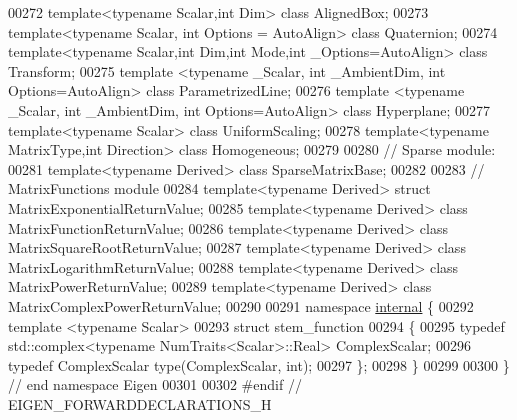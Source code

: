 \begin{DoxyCode}
00272 \textcolor{keyword}{template}<\textcolor{keyword}{typename} Scalar,\textcolor{keywordtype}{int} Dim> \textcolor{keyword}{class }AlignedBox;
00273 \textcolor{keyword}{template}<\textcolor{keyword}{typename} Scalar, \textcolor{keywordtype}{int} Options = AutoAlign> \textcolor{keyword}{class }Quaternion;
00274 \textcolor{keyword}{template}<\textcolor{keyword}{typename} Scalar,\textcolor{keywordtype}{int} Dim,\textcolor{keywordtype}{int} Mode,\textcolor{keywordtype}{int} \_Options=AutoAlign> \textcolor{keyword}{class }Transform;
00275 \textcolor{keyword}{template} <\textcolor{keyword}{typename} \_Scalar, \textcolor{keywordtype}{int} \_AmbientDim, \textcolor{keywordtype}{int} Options=AutoAlign> \textcolor{keyword}{class }ParametrizedLine;
00276 \textcolor{keyword}{template} <\textcolor{keyword}{typename} \_Scalar, \textcolor{keywordtype}{int} \_AmbientDim, \textcolor{keywordtype}{int} Options=AutoAlign> \textcolor{keyword}{class }Hyperplane;
00277 \textcolor{keyword}{template}<\textcolor{keyword}{typename} Scalar> \textcolor{keyword}{class }UniformScaling;
00278 \textcolor{keyword}{template}<\textcolor{keyword}{typename} MatrixType,\textcolor{keywordtype}{int} Direction> \textcolor{keyword}{class }Homogeneous;
00279 
00280 \textcolor{comment}{// Sparse module:}
00281 \textcolor{keyword}{template}<\textcolor{keyword}{typename} Derived> \textcolor{keyword}{class }SparseMatrixBase;
00282 
00283 \textcolor{comment}{// MatrixFunctions module}
00284 \textcolor{keyword}{template}<\textcolor{keyword}{typename} Derived> \textcolor{keyword}{struct }MatrixExponentialReturnValue;
00285 \textcolor{keyword}{template}<\textcolor{keyword}{typename} Derived> \textcolor{keyword}{class }MatrixFunctionReturnValue;
00286 \textcolor{keyword}{template}<\textcolor{keyword}{typename} Derived> \textcolor{keyword}{class }MatrixSquareRootReturnValue;
00287 \textcolor{keyword}{template}<\textcolor{keyword}{typename} Derived> \textcolor{keyword}{class }MatrixLogarithmReturnValue;
00288 \textcolor{keyword}{template}<\textcolor{keyword}{typename} Derived> \textcolor{keyword}{class }MatrixPowerReturnValue;
00289 \textcolor{keyword}{template}<\textcolor{keyword}{typename} Derived> \textcolor{keyword}{class }MatrixComplexPowerReturnValue;
00290 
00291 \textcolor{keyword}{namespace }\hyperlink{namespaceinternal}{internal} \{
00292 \textcolor{keyword}{template} <\textcolor{keyword}{typename} Scalar>
00293 \textcolor{keyword}{struct }stem\_function
00294 \{
00295   \textcolor{keyword}{typedef} std::complex<typename NumTraits<Scalar>::Real> ComplexScalar;
00296   \textcolor{keyword}{typedef} ComplexScalar type(ComplexScalar, \textcolor{keywordtype}{int});
00297 \};
00298 \}
00299 
00300 \} \textcolor{comment}{// end namespace Eigen}
00301 
00302 \textcolor{preprocessor}{#endif // EIGEN\_FORWARDDECLARATIONS\_H}
\end{DoxyCode}
